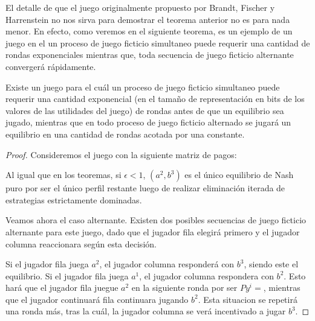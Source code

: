 El detalle de que el juego originalmente propuesto por Brandt, Fischer y Harrenstein no nos sirva para demostrar el teorema anterior no es para nada menor. En efecto, como veremos en el siguiente teorema, es un ejemplo de un juego en el un proceso de juego ficticio simultaneo puede requerir una cantidad de rondas exponenciales mientras que, toda secuencia de juego ficticio alternante convergerá rápidamente.

\begin{theorem}
    Existe un juego para el cuál un proceso de juego ficticio simultaneo puede requerir una cantidad exponencial (en el tamaño de representación en bits de los valores de las utilidades del juego) de rondas antes de que un equilibrio sea jugado, mientras que en todo proceso de juego ficticio alternado se jugará un equilibrio en una cantidad de rondas acotada por una constante.
\end{theorem}


\begin{proof}
    Consideremos el juego con la siguiente matriz de pagos:

    

    Al igual que en los teoremas, si $\epsilon < 1$, $(a^2, b^3)$ es el único equilibrio de Nash puro por ser el único perfil restante luego de realizar eliminación iterada de estrategias estrictamente dominadas.




    Veamos ahora el caso alternante. Existen dos posibles secuencias de juego ficticio alternante para este juego, dado que el jugador fila elegirá primero y el jugador columna reaccionara según esta decisión.

    Si el jugador fila juega $a^2$, el jugador columna responderá con $b^3$, siendo este el equilibrio.
    Si el jugador fila juega $a^1$, el jugador columna respondera con $b^2$. Esto hará que el jugador fila juegue $a^2$ en la siguiente ronda por ser $Py^i = $, mientras que el jugador continuará fila continuara jugando $b^2$. Esta situacion se repetirá una ronda más, tras la cuál, la jugador columna se verá incentivado a jugar $b^3$.


\end{proof}
